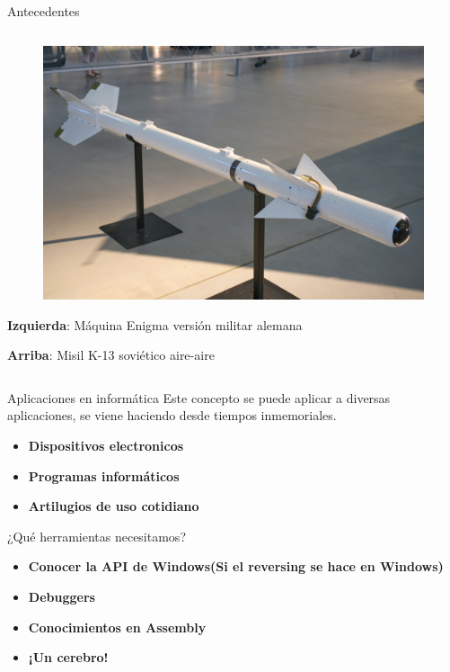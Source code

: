 \documentclass{beamer}
\begin{document}
\begin{frame}{Antecedentes}
\begin{columns}
\begin{column}{.50\textwidth}
\begin{figure}
\vspace{-1ex}\hspace{-2.5ex}\includegraphics[scale=0.11]{K-13.jpg}
\end{figure}

\vspace{2ex}
\textbf{Izquierda}: Máquina Enigma versión militar alemana

\vspace{1ex}

\textbf{Arriba}: Misil K-13 soviético aire-aire 

\end{column}

\end{columns}

\end{frame}

\begin{frame}{Aplicaciones en informática}
Este concepto se puede aplicar a diversas aplicaciones, se viene haciendo desde tiempos inmemoriales.
\begin{itemize}
	\item \textbf{Dispositivos electronicos} 
	\item \textbf{Programas informáticos}
	\item \textbf{Artilugios de uso cotidiano}
\end{itemize}
\end{frame}

\begin{frame}{¿Qué herramientas necesitamos?}
\begin{itemize}
\item \textbf{Conocer la API de Windows(Si el reversing se hace en Windows)}
\item \textbf{Debuggers}
\item \textbf{Conocimientos en Assembly}
\item \textbf{¡Un cerebro!}
\end{itemize}

\end{frame}
\end{document}
